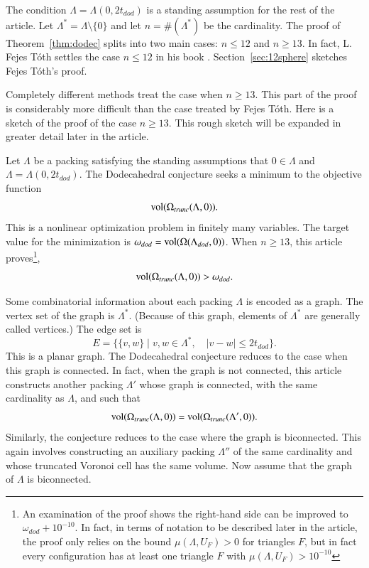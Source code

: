 \documentclass{article} %
\begin{document}
The condition $\Lambda=\Lambda(0,2t_{dod})$ is a standing assumption for the
rest of the article.
%
Let $\Lambda^*=\Lambda\setminus\{0\}$ and let 
$n=\#(\Lambda^*)$ be the cardinality. The proof of
Theorem~\ref{thm:dodec} splits into two main cases: $n\le 12$ and
$n\ge 13$. In fact, L. Fejes T\'oth settles
the case $n\le 12$ 
in his book \cite{Toth:1964:Regular}. Section~\ref{sec:12sphere}
sketches Fejes T\'oth's proof.

Completely different methods treat the case when $n\ge 13$. This part
of the proof is considerably more difficult than the case treated by Fejes
T\'oth. Here is a sketch of the proof of the case $n\ge 13$. This
rough sketch will be expanded in greater detail later in
the article.

Let $\Lambda$ be a packing satisfying the standing assumptions that
$0\in\Lambda$ and $\Lambda = \Lambda(0,2t_{dod})$. The Dodecahedral
conjecture seeks a minimum to the objective function
$$
{\operatorname{vol}}(\Omega_{trunc}(\Lambda,0)).
$$
This is a nonlinear optimization problem in finitely many variables.
The target value for the minimization is $\omega_{dod}={\operatorname{vol}}(\Omega(\Lambda_{dod},0))$.  When $n\ge 13$, this article proves\footnote{An examination of the proof shows the right-hand side can be improved to $\omega_{dod}+10^{-10}$.  In fact, in terms of notation to be described later in the article, the proof only
relies on the bound $\mu(\Lambda,U_F) >0$ for triangles $F$, but in fact every configuration has at least one triangle $F$ with $\mu(\Lambda,U_F) > 10^{-10}$},
$$
{\operatorname{vol}}(\Omega_{trunc}(\Lambda,0))  > \omega_{dod}.
$$

Some combinatorial information about each packing $\Lambda$ is encoded
as a  graph.  %
The vertex set of the graph is $\Lambda^*$.
(Because of this graph,  elements of $\Lambda^*$ are generally called vertices.)
The edge set is 
$$
E = \{\{v,w\} \mid v,w\in\Lambda^*,\quad   |v-w| \le 2t_{dod}\}.
$$
This is a planar graph.  
The Dodecahedral conjecture reduces to the case when this graph is connected.  In fact,
when the graph is not connected, this article constructs another packing
$\Lambda'$ whose graph is connected, with the same cardinality as $\Lambda$,
and such that
$$
{\operatorname{vol}}(\Omega_{trunc}(\Lambda,0)) = {\operatorname{vol}}(\Omega_{trunc}(\Lambda',0)). 
$$
Similarly, the conjecture reduces to the case where the graph is biconnected.
  This again involves constructing an auxiliary 
packing $\Lambda''$ of the same cardinality and whose  truncated Voronoi cell has the same volume.  Now assume that the graph of $\Lambda$ is 
biconnected.
\end{document}
